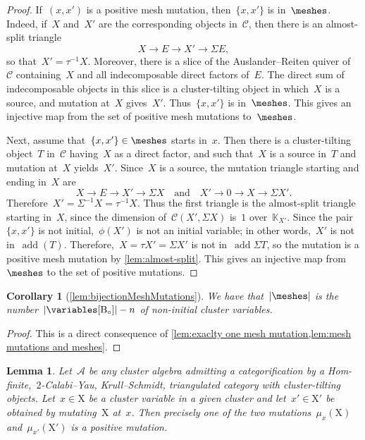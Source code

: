 \documentclass{amsart}
\newtheorem{corollary}[theorem]{Corollary}
\newtheorem{lemma}[theorem]{Lemma}
\theoremstyle{definition}
\newcommand{\cluster}{\mathrm{X}} %
\newcommand{\B}{\mathrm{B}} %
\newcommand{\field}{\mathbb{K}}
\newcommand{\cat}{\mathcal{C}}
\newcommand{\susp}{\Sigma}
\newcommand{\add}{\operatorname{add}}
\begin{document}
\begin{proof}
\enlargethispage{.3cm}
If~$(x,x')$ is a positive mesh mutation, then~$\{x,x'\}$ is in~$\meshes$.  Indeed, if~$X$ and~$X'$ are the corresponding objects in~$\cat$, then there is an almost-split triangle
\[
X\to E\to X' \to \susp E,
\]
so that~$X' = \tau^{-1}X$.  Moreover, there is a slice of the Auslander--Reiten quiver of~$\cat$ containing~$X$ and all indecomposable direct factors of~$E$.  The direct sum of indecomposable objects in this slice is a cluster-tilting object in which~$X$ is a source, and mutation at~$X$ gives~$X'$.  Thus~$\{x,x'\}$ is in~$\meshes$.  This gives an injective map from the set of positive mesh mutations to~$\meshes$.
 
\smallskip
Next, assume that~$\{x,x'\}\in \meshes$ starts in~$x$.  Then there is a cluster-tilting object~$T$ in~$\cat$ having~$X$ as a direct factor, and such that~$X$ is a source in~$T$ and mutation at~$X$ yields~$X'$.  Since~$X$ is a source, the mutation triangle starting and ending in~$X$ are
\[
X\to E\to X' \to \susp X \quad \textrm{and} \quad  X' \to 0 \to X \to \susp X'.
\]
Therefore~$X' = \susp^{-1}X = \tau^{-1}X$.  Thus the first triangle is the almost-split triangle starting in~$X$, since the dimension of~$\cat(X',\susp X)$ is~$1$ over~$\field_{X'}$.  Since the pair~$\{x,x'\}$ is not initial,~$\phi(X')$ is not an initial variable; in other words,~$X'$ is not in~$\add(T)$.  Therefore,~$X = \tau X' = \susp X'$ is not in~$\add\susp T$, so the mutation is a positive mesh mutation by \cref{lem:almost-split}.  This gives an injective map from~$\meshes$ to the set of positive mutations. 
\end{proof}

\begin{corollary}[\cref{lem:bijectionMeshMutations}]
\label{coro:number of positive meshes}
We have that~$|\meshes|$ is the number~$|\variables[\B_\circ]|-n$ of non-initial cluster variables.
\end{corollary}

\begin{proof}
This is a direct consequence of \cref{lem:exaclty one mesh mutation,lem:mesh mutations and meshes}.
\end{proof}

\begin{lemma}
\label{lemma:positive mutation triangles}
Let~$\mathcal{A}$ be any cluster algebra admitting a categorification by a Hom-finite,~$2$-Calabi--Yau, Krull--Schmidt, triangulated category with cluster-tilting objects.
Let~$x\in\cluster$ be a cluster variable in a given cluster and let~$x' \in \cluster'$ be obtained by mutating~$\cluster$ at~$x$.
Then precisely one of the two mutations~$\mu_x(\cluster)$ and~$\mu_{x'}(\cluster')$ is a positive mutation.
\end{lemma}
\end{document}
